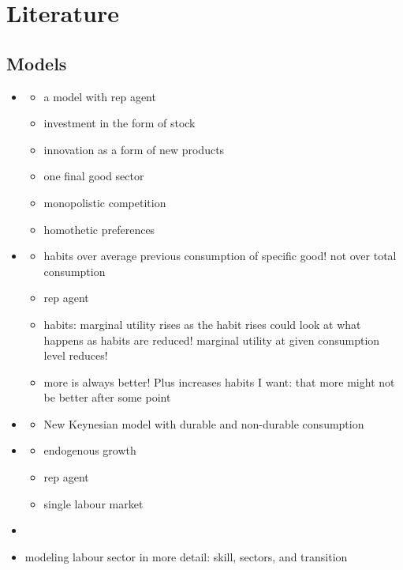 \section{Literature}


\subsection{Models}
\begin{itemize}
\item \cite{Bilbiie2012EndogenousCycles}
\begin{itemize}
\item a model with rep agent
\item investment in the form of stock 
\item innovation as a form of new products
\item one final good sector
\item monopolistic competition
\item homothetic preferences
\end{itemize}
\item \cite{Ravn2006DeepHabits}
\begin{itemize}
 \item habits over average previous consumption of specific good! not over total consumption
 \item rep agent 
 \item habits: marginal utility rises as the habit rises \ar could look at what happens as habits are reduced! \ar marginal utility at given consumption level reduces!
 \item more is always better! Plus increases habits \ar I want: that more might not be better after some point
\end{itemize}
\item \cite{McKay2021LumpyPolicy}
\begin{itemize}
\item New Keynesian model with durable and non-durable consumption 
\end{itemize}
\item \cite{Acemoglu2012TheChange}
\begin{itemize}
\item endogenous growth
\item rep agent
\item single labour market
\end{itemize}
\item \cite{Heikkinen2015DegrowthConsumers}
\item \cite{Borissov2019CarbonDevelopment} modeling labour sector in more detail: skill, sectors, and transition
\end{itemize}

